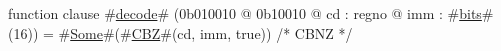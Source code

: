 function clause #\hyperref[zdecode]{decode}# (0b010010 @ 0b10010 @ cd : regno @ imm : #\hyperref[zbits]{bits}#(16)) = #\hyperref[zSome]{Some}#(#\hyperref[zCBZ]{CBZ}#(cd, imm, true))  /* CBNZ */
